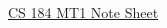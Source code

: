 \documentclass[3pt,landscape]{article}
\begin{document}
\raggedright
\footnotesize
\begin{multicols}{3}


\setlength{\premulticols}{1pt}
\setlength{\postmulticols}{1pt}
\setlength{\multicolsep}{1pt}
\setlength{\columnsep}{2pt}

\begin{center}
    \Large{\underline{CS 184 MT1 Note Sheet}} \\
\end{center}



\end{multicols}
\end{document}
